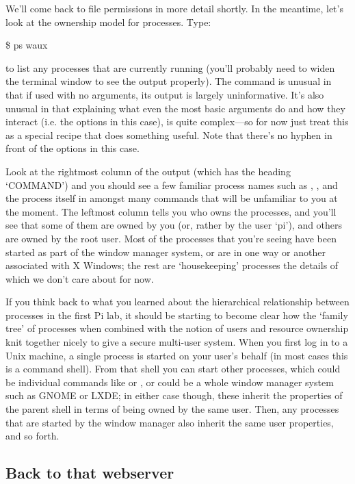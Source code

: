 We'll come back to file permissions in more detail shortly. In the
meantime, let's look at the ownership model for processes. Type:

\begin{ttoutenv}
\$ ps waux
\end{ttoutenv}

to list any processes that are currently running (you'll probably need to widen the terminal window to see the output properly). The  command is unusual in that if used with no arguments, its output is largely uninformative. It's also unusual in that explaining what even the most basic arguments do and how they interact (i.e. the  options in this case), is quite complex---so for now just treat this as a special recipe that does something useful. Note that there's no hyphen in front of the options in this case.

Look at the rightmost column of the output (which has the heading `COMMAND') and you should see a few familiar process names such as , , and the  process itself in amongst many commands that will be unfamiliar to you at the moment. The leftmost column tells you who owns the processes, and you'll see that some of them are owned by you (or, rather by the user `pi'), and others are owned by the root user. Most of the processes that you're seeing have been started as part of the window manager system, or are in one way or another associated with X Windows; the rest are `housekeeping' processes the details of which we don't care about for now.

If you think back to what you learned about the hierarchical relationship between processes in the first Pi lab, it should be starting to become clear how the `family tree' of processes when combined with the notion of users and resource ownership knit together nicely to give a secure multi-user system. When you first log in to a Unix machine, a single process is started on your user's behalf (in most cases this is a command shell). From that shell you can start other processes, which could be individual commands like  or , or could be a whole window manager system such as GNOME or LXDE; in either case though, these inherit the properties of the parent shell in terms of being owned by the same user. Then, any processes that are started by the window manager also inherit the same user properties, and so forth.

\subsection{Back to that webserver}

